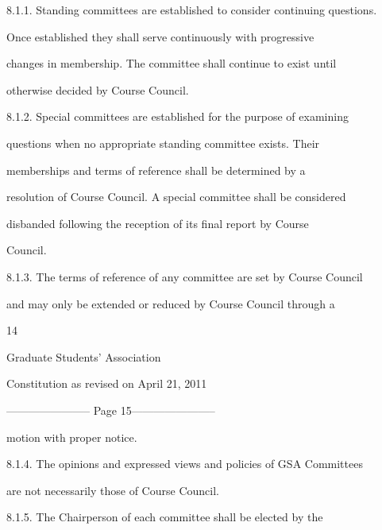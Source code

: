 8.1.1.  Standing committees are established to consider continuing questions.  

        Once   established   they   shall   serve   continuously   with   progressive  

        changes  in  membership.  The  committee  shall  continue  to  exist  until  

        otherwise decided by Course Council.  



8.1.2.  Special  committees  are  established  for  the  purpose  of  examining  

        questions   when   no   appropriate   standing   committee   exists.   Their  

        memberships   and   terms   of   reference   shall   be   determined   by   a  

        resolution of Course Council. A special committee shall be considered  

        disbanded   following   the   reception   of   its   final   report   by   Course  

        Council.  



8.1.3. The  terms  of  reference  of  any  committee  are  set  by  Course  Council  

        and  may  only  be  extended  or  reduced  by  Course  Council  through  a  



                                                 

                                              14  



                                Graduate Students’ Association  



                           Constitution as revised on April 21, 2011  


----------------------- Page 15-----------------------

        motion with proper notice.  



8.1.4. The  opinions  and  expressed  views  and  policies  of  GSA  Committees  

        are not necessarily those of Course Council.  



8.1.5. The      Chairperson      of    each    committee       shall   be    elected    by    the  

